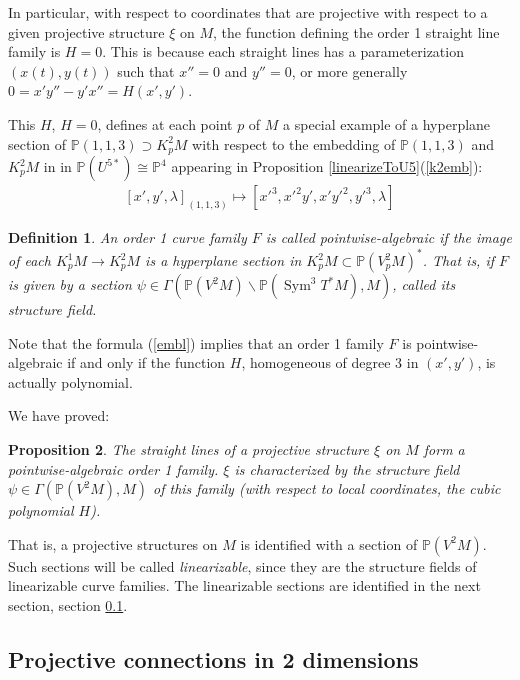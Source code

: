\documentclass[12pt]{article}
\numberwithin{equation}{section}
\theoremstyle{plain}
\newtheorem{definition}{Definition}[section]
\newtheorem{proposition}[definition]{Proposition}
\theoremstyle{definition}
\renewcommand{\P}{\mathbb{P}}
\newcommand{\ra}{\rightarrow}
\begin{document}
In particular, with respect to coordinates that are projective with respect to a given projective structure $\xi$ on $M$, the function defining the order 1 straight line family is $H=0$. This is because each straight lines has a parameterization $(x(t),y(t))$ such that $x''=0$ and $y''=0$, or more generally $0=x'y''-y'x''=H(x',y')$.

This $H$, $H=0$, defines at each point $p$ of $M$ a special example of a hyperplane section of $\P(1,1,3)\supset K^{2}_{p}M$ with respect to the embedding of $\P(1,1,3)$ and $K^{2}_{p}M$ in in $\P(U^{5*})\cong\P^{4}$ appearing in Proposition \ref{linearizeToU5}(\ref{k2emb}):
\begin{align}\label{embl}
[x',y',\lambda]_{(1,1,3)}\mapsto[x'^{3},x'^{2}y',x'y'^{2},y'^{3},\lambda]
\end{align}

\begin{definition}\label{pointwisealgebraic} An order 1 curve family $F$ is called \emph{pointwise-algebraic} if the image of each $K^{1}_{p}M\ra K^{2}_{p}M$ is a hyperplane section in $K^{2}_{p}M\subset\P(V^{2}_{p}M)^{*}$. That is, if $F$ is given by a section $\psi\in\Gamma(\P(V^{2}M)\backslash \P(\operatorname{Sym}^{3}T^{*}M),M)$, called its \emph{structure field}.
\end{definition}

Note that the formula (\ref{embl}) implies that an order 1 family $F$ is pointwise-algebraic if and only if the function $H$, homogeneous of degree 3 in $(x',y')$, is actually polynomial.

We have proved:
\begin{proposition} The straight lines of a projective structure $\xi$ on $M$ form a pointwise-algebraic order 1 family. $\xi$ is characterized by the structure field $\psi\in\Gamma(\P(V^{2}M),M)$ of this family (with respect to local coordinates, the cubic polynomial $H$).
\end{proposition}
That is, a projective structures on $M$ is identified with a section of $\P(V^{2}M)$. Such sections will be called \emph{linearizable}, since they are the structure fields of linearizable curve families. The linearizable sections are identified in the next section, section \ref{projconn}.

\subsection{Projective connections in 2 dimensions}\label{projconn}
\end{document}
